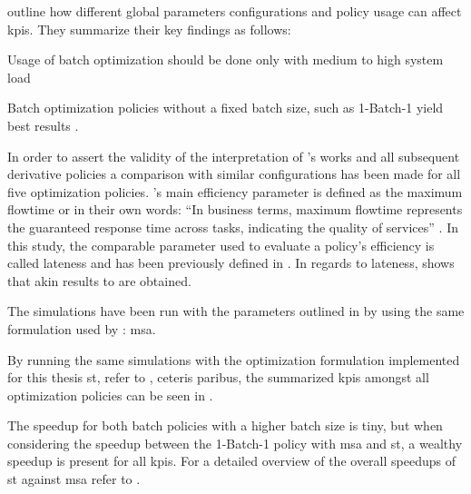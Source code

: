 \citet[pp. 18--22]{Zeng2005} outline how different global parameters configurations and policy usage can affect \glspl{kpi}. They summarize their key findings as follows:
\begin{enumerate*}
	\item Usage of batch optimization should be done only with medium to high system load \citep[p. 24]{Zeng2005}
	\item Batch optimization policies without a fixed batch size, such as 1-Batch-1 yield best results \citep[p. 24]{Zeng2005}.
\end{enumerate*}

In order to assert the validity of the interpretation of \citet{Zeng2005}'s works and all subsequent derivative policies a comparison with similar configurations has been made for all five optimization policies. \citet{Zeng2005}'s main efficiency parameter is defined as the maximum flowtime or in their own words: ``In business terms, maximum flowtime represents the guaranteed response time across tasks, indicating the quality of services'' \citep[p. 17]{Zeng2005}. In this study, the comparable parameter used to evaluate a policy's efficiency is called lateness and has been previously defined in . In regards to lateness,  shows that akin results to \citet{Zeng2005} are obtained.


The simulations have been run with the parameters outlined in  by using the same formulation used by \citet{Zeng2005}: \gls{msa}.

By running the same simulations with the optimization formulation implemented for this thesis \ie \gls{st}, refer to , ceteris paribus, the summarized \glspl{kpi} amongst all optimization policies can be seen in .


The speedup for both batch policies with a higher batch size is tiny, but when considering the speedup between the 1-Batch-1 policy with \gls{msa} and \gls{st}, a wealthy speedup is present for all \glspl{kpi}. For a detailed overview of the overall speedups of \gls{st} against \gls{msa} refer to .

